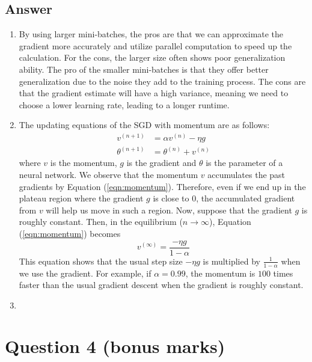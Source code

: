 \documentclass[
	12pt, %
]{../Template/fphw}
\begin{document}

\subsection*{Answer} 
\begin{enumerate}[label = (\arabic*)]
\item By using larger mini-batches, the pros are that we can approximate the gradient more accurately and utilize parallel computation to speed up the calculation. For the cons, the larger size often shows poor generalization ability. The pro of the smaller mini-batches is that they offer better generalization due to the noise they add to the training process. The cons are that the gradient estimate will have a high variance, meaning we need to choose a lower learning rate, leading to a longer runtime.
\item The updating equations of the SGD with momentum are as follows:
\begin{align}
    v^{(n+1)} &= \alpha v^{(n)} - \eta g \label{eqn:momentum} \\
    \theta^{(n+1)} &= \theta^{(n)}+v^{(n)}
\end{align}
where $v$ is the momentum, $g$ is the gradient and $\theta$ is the parameter of a neural network. We observe that the momentum $v$ accumulates the past gradients by Equation (\ref{eqn:momentum}). Therefore, even if we end up in the plateau region where the gradient $g$ is close to $0$, the accumulated gradient from $v$ will help us move in such a region. Now, suppose that the gradient $g$ is roughly constant. Then, in the equilibrium ($n\to \infty$), Equation (\ref{eqn:momentum}) becomes
\begin{equation}
    v^{(\infty)} = \frac{-\eta g}{1-\alpha}
\end{equation}
This equation shows that the usual step size $-\eta g$ is multiplied by $\frac{1}{1-\alpha}$ when we use the gradient. For example, if $\alpha=0.99$, the momentum is $100$ times faster than the usual gradient descent when the gradient is roughly constant.
\item 

\end{enumerate}

\section*{Question 4 (bonus marks)}
\end{document}
